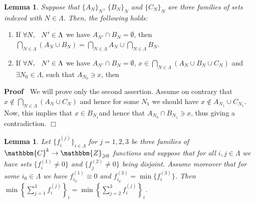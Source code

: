 \documentclass{article}
\newcommand{\nin}{\not\in}
\renewenvironment{proof}{\noindent\textbf{Proof\ }}{\hspace*{\fill}$\Box$\medskip}
\newtheorem{lemma}[proposition]{Lemma}
\theoremstyle{remark}
\begin{document}
\begin{lemma}
  \label{P-def:lem-threeset}Suppose that $\{ A_N \}_N$, $\{ B_N \}_N$ and $\{
  C_N \}_N$ are three families of sets indexed with $N \in \Lambda$. Then, the
  following holds:
\end{lemma}
\begin{enumerate}
  \item If $\forall N, \hspace{0.75em} N' \in \Lambda$ we have $A_{N'} \cap
  B_N = \emptyset$, then $\bigcap_{N \in \Lambda} (A_N \cup B_N) = \bigcap_{N
  \in \Lambda} A_N \cup \bigcap_{N \in \Lambda} B_N$.
  
  \item If $\forall N, \hspace{0.75em} N' \in \Lambda$ we have $A_{N'} \cap
  B_N = \emptyset$, $x \in \bigcap_{N \in \Lambda} (A_N \cup B_N \cup C_N)$
  and $\exists N_0 \in \Lambda$, such that $A_{N_0} \ni x$, then
\end{enumerate}
\begin{proof}
  We will prove only the second assertion. Assume on contrary that $x \nin
  \bigcap_{N \in \Lambda} (A_N \cup C_N)$ and hence for some $N_1$ we should
  have $x \nin A_{N_1} \cup C_{N_1}$. Now, this implies that $x \in
  B_{N_1}$and hence that $A_{N_0} \cap B_{N_1} \ni x$, thus giving a
  contradiction.
\end{proof}

\begin{lemma}
  \label{lem-4}Let $\{ f^{(j)}_i \}_{i \in \Lambda}$ for $j = 1, 2, 3$ be
  three families of $\mathbbm{C}^k \rightarrow \mathbbm{Z}_{\geqslant 0}$
  functions and suppose that for all $i, j \in \Lambda$ we have sets $\{
  f^{(1)}_i \neq 0 \}$ and $\{ f_j^{(2)} \neq 0 \}$ being disjoint. Assume
  moreover that for some $i_0 \in \Lambda$ we have $f^{(1)}_{i_0} \equiv 0$
  and $f^{(3)}_{i_0} = \min \{ f_i^{(3)} \}$. Then $\min \left\{ \sum_{j =
  1}^3 f^{(j)}_i \right\}_i = \min \left\{ \sum_{j = 2}^3 f_i^{(j)}
  \right\}_i$.
\end{lemma}
\end{document}
